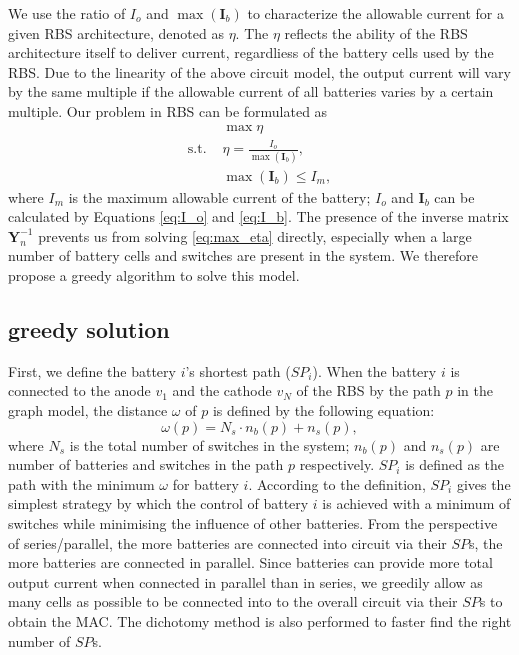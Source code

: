 \documentclass{article}
\begin{document}
We use the ratio of $I_o$ and $\max (\bm{I}_b)$ to characterize the allowable current for a given RBS architecture, denoted as $\eta$.
The $\eta$ reflects the ability of the RBS architecture itself to deliver current, regardliess of the battery cells used by the RBS.
Due to the linearity of the above circuit model, the output current will vary by the same multiple if the allowable current of all batteries varies by a certain multiple.
Our problem in RBS can be formulated as
\begin{align}
        & \max \eta \label{eq:max_eta}\\
    \mathrm{s.t.}\,\, & \eta = \frac{I_o}{\max (\bm{I}_b)}, \\
        & \max (\bm{I}_b) \leq I_m,
\end{align}
where $I_m$ is the maximum allowable current of the battery; $I_o$ and $\bm{I}_b$ can be calculated by Equations \ref{eq:I_o} and \ref{eq:I_b}.
The presence of the inverse matrix $\bm{Y}_n^{-1}$ prevents us from solving \ref{eq:max_eta} directly, especially when a large number of battery cells and switches are present in the system.
We therefore propose a greedy algorithm to solve this model.


\subsection{greedy solution}
First, we define the battery $i$'s shortest path ($SP_i$).
When the battery $i$ is connected to the anode $v_1$ and the cathode $v_N$ of the RBS by the path $p$ in the graph model, the distance $\omega$ of $p$ is defined by the following equation:
\begin{equation}
    \omega(p) = N_s \cdot n_b (p) + n_s (p),
\end{equation}
where $N_s$ is the total number of switches in the system; $n_b(p)$ and $n_s(p)$ are number of batteries and switches in the path $p$ respectively.
$SP_i$ is defined as the path with the minimum $\omega$ for battery $i$.
According to the definition, $SP_i$ gives the simplest strategy by which the control of battery $i$ is achieved with a minimum of switches while minimising the influence of other batteries.
From the perspective of series/parallel, the more batteries are connected into circuit via their $SP$s, the more batteries are connected in parallel.
Since batteries can provide more total output current when connected in parallel than in series, we greedily allow as many cells as possible to be connected into to the overall circuit via their $SP$s to obtain the MAC.
The dichotomy method is also performed to faster find the right number of $SP$s.
\end{document}
